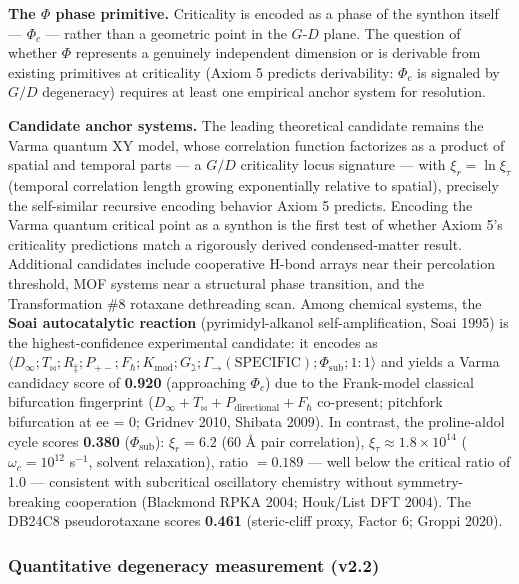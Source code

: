 \documentclass[12pt,a4paper]{article}
\begin{document}
\textbf{The $\Phi$ phase primitive.} Criticality is encoded as a phase of the synthon itself --- $\Phi_c$ --- rather than a geometric point in the $G$-$D$ plane. The question of whether $\Phi$ represents a genuinely independent dimension or is derivable from existing primitives at criticality (Axiom 5 predicts derivability: $\Phi_c$ is signaled by $G/D$ degeneracy) requires at least one empirical anchor system for resolution.

\textbf{Candidate anchor systems.} The leading theoretical candidate remains the Varma quantum XY model, whose correlation function factorizes as a product of spatial and temporal parts --- a $G/D$ criticality locus signature --- with $\xi_r = \ln \xi_\tau$ (temporal correlation length growing exponentially relative to spatial), precisely the self-similar recursive encoding behavior Axiom 5 predicts. Encoding the Varma quantum critical point as a synthon is the first test of whether Axiom 5's criticality predictions match a rigorously derived condensed-matter result. Additional candidates include cooperative H-bond arrays near their percolation threshold, MOF systems near a structural phase transition, and the Transformation \#8 rotaxane dethreading scan. Among chemical systems, the \textbf{Soai autocatalytic reaction} (pyrimidyl-alkanol self-amplification, Soai 1995) is the highest-confidence experimental candidate: it encodes as $\langle D_{\infty}; T_{\bowtie}; R_{\ddagger}; P_{+-}; F_{\hbar}; K_{\text{mod}}; G_{\gimel}; \Gamma_{\to}(\text{SPECIFIC}); \Phi_{\text{sub}}; 1{:}1 \rangle$ and yields a Varma candidacy score of \textbf{0.920} (approaching $\Phi_c$) due to the Frank-model classical bifurcation fingerprint ($D_{\infty} + T_{\bowtie} + P_{\text{directional}} + F_{\hbar}$ co-present; pitchfork bifurcation at ee = 0; Gridnev 2010, Shibata 2009). In contrast, the proline-aldol cycle scores \textbf{0.380} ($\Phi_{\text{sub}}$): $\xi_r = 6.2$ (60 Å pair correlation), $\xi_\tau \approx 1.8 \times 10^{14}$ ($\omega_c = 10^{12}$ s$^{-1}$, solvent relaxation), ratio $= 0.189$ --- well below the critical ratio of 1.0 --- consistent with subcritical oscillatory chemistry without symmetry-breaking cooperation (Blackmond RPKA 2004; Houk/List DFT 2004). The DB24C8 pseudorotaxane scores \textbf{0.461} (steric-cliff proxy, Factor 6; Groppi 2020).

\subsubsection{Quantitative degeneracy measurement (v2.2)}
\end{document}
